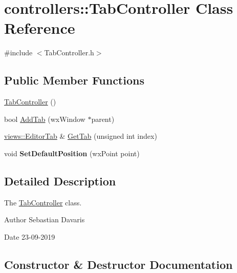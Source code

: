 \hypertarget{classcontrollers_1_1_tab_controller}{}\section{controllers\+:\+:Tab\+Controller Class Reference}
\label{classcontrollers_1_1_tab_controller}


{\ttfamily \#include $<$Tab\+Controller.\+h$>$}

\subsection*{Public Member Functions}
\begin{DoxyCompactItemize}
\item 
\hyperlink{classcontrollers_1_1_tab_controller_a963599a5fc7fc89154db930dda9a3c0d}{Tab\+Controller} ()
\item 
bool \hyperlink{classcontrollers_1_1_tab_controller_ae937870bbca6c9cd3a240ae78b5a7377}{Add\+Tab} (wx\+Window $\ast$parent)
\item 
\hyperlink{classviews_1_1_editor_tab}{views\+::\+Editor\+Tab} \& \hyperlink{classcontrollers_1_1_tab_controller_a9b1538d67e2487edf7837daa806870f3}{Get\+Tab} (unsigned int index)
\item 
\mbox{\label{classcontrollers_1_1_tab_controller_a2b737b8e866457fadfa10129e7f4dd34}} 
void {\bfseries Set\+Default\+Position} (wx\+Point point)
\end{DoxyCompactItemize}


\subsection{Detailed Description}
The \hyperlink{classcontrollers_1_1_tab_controller}{Tab\+Controller} class. \begin{DoxyAuthor}{Author}
Sebastian Davaris 
\end{DoxyAuthor}
\begin{DoxyDate}{Date}
23-\/09-\/2019 
\end{DoxyDate}


\subsection{Constructor \& Destructor Documentation}
\mbox{\label{classcontrollers_1_1_tab_controller_a963599a5fc7fc89154db930dda9a3c0d}} 
